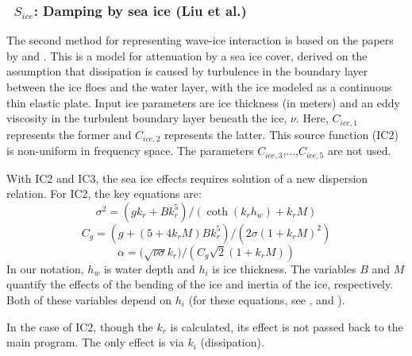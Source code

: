 \vsssub
\subsubsection{~$S_{ice}$: Damping by sea ice (Liu et al.)} \label{sec:ICE2}
\vsssub


\noindent
The second method for representing wave-ice interaction is based on
the papers by \cite{art:LMC88} and \cite{art:LHV91}. This is a model
for  attenuation by a sea ice cover, derived on the assumption that
dissipation is caused by turbulence in the boundary layer between the
ice floes and the water layer, with the ice modeled as a continuous
thin elastic plate. Input ice parameters are ice thickness (in meters)
and an eddy viscosity in the turbulent boundary layer beneath the ice,
${\nu}$. Here, ${C_{ice,1}}$ represents the former and ${C_{ice,2}}$
represents the latter. This source function (IC2) is non-uniform in
frequency space. The parameters ${C_{ice,3}}$,...,${C_{ice,5}}$ are
not used.

\vspace{\baselineskip} \noindent
With IC2 and IC3, the sea ice effects requires solution of a new
dispersion relation. For IC2, the key equations are:
\begin{equation}\label{eq:ice1}
  {\sigma}^2 = ({gk_r} + {Bk_r^5})/(\coth({k_r}{h_w}) + {k_r}{M})
\end{equation}
\begin{equation}\label{eq:ice2}
  {C_g} = (g + (5 + 4{k_r}{M}){B}{k_r^5})/(2{\sigma}(1+{k_r}{M})^2)
\end{equation}
\begin{equation}\label{eq:ice3}
  {\alpha} = (\sqrt{{\nu\sigma}}{k_r)}/({C_g}\sqrt{2}(1+{k_r}{M}))
\end{equation}
In our notation, $h_w$ is water depth and $h_i$ is ice thickness.
The variables $B$ and $M$ quantify the effects of the bending of
the ice and inertia of the ice, respectively. Both of these
variables depend on $h_i$ (for these equations, see
\citeauthor{art:LMC88}, \citeyear{art:LMC88} and \citeauthor{art:LHV91}
\citeyear{art:LHV91}).

\vspace{\baselineskip} \noindent
In the case of IC2, though the ${k_r}$ is calculated, its effect
is not passed back to the main program. The only effect is via
${k_i}$ (dissipation).
